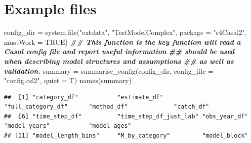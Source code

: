 \documentclass[
]{book}
\newenvironment{Shaded}{\begin{snugshade}}{\end{snugshade}}
\newcommand{\AttributeTok}[1]{\textcolor[rgb]{0.77,0.63,0.00}{#1}}
\newcommand{\ConstantTok}[1]{\textcolor[rgb]{0.00,0.00,0.00}{#1}}
\newcommand{\DocumentationTok}[1]{\textcolor[rgb]{0.56,0.35,0.01}{\textbf{\textit{#1}}}}
\newcommand{\FloatTok}[1]{\textcolor[rgb]{0.00,0.00,0.81}{#1}}
\newcommand{\FunctionTok}[1]{\textcolor[rgb]{0.00,0.00,0.00}{#1}}
\newcommand{\NormalTok}[1]{#1}
\newcommand{\OtherTok}[1]{\textcolor[rgb]{0.56,0.35,0.01}{#1}}
\newcommand{\SpecialCharTok}[1]{\textcolor[rgb]{0.00,0.00,0.00}{#1}}
\newcommand{\StringTok}[1]{\textcolor[rgb]{0.31,0.60,0.02}{#1}}
\begin{document}
\hypertarget{example-files}{%
\section{Example files}\label{example-files}}

\begin{Shaded}
\begin{Highlighting}[]
\NormalTok{config\_dir }\OtherTok{=} \FunctionTok{system.file}\NormalTok{(}\StringTok{"extdata"}\NormalTok{, }\StringTok{"TestModelComplex"}\NormalTok{, }\AttributeTok{package =} \StringTok{"r4Casal2"}\NormalTok{, }\AttributeTok{mustWork =} \ConstantTok{TRUE}\NormalTok{)}
\DocumentationTok{\#\# This function is the key function will read a Casal config file and report useful information}
\DocumentationTok{\#\# should be used when describing model structures and assumptions}
\DocumentationTok{\#\# as well as validation.}
\NormalTok{summary }\OtherTok{=} \FunctionTok{summarise\_config}\NormalTok{(config\_dir, }\AttributeTok{config\_file =} \StringTok{"config.csl2"}\NormalTok{, }\AttributeTok{quiet =}\NormalTok{ T)}
\FunctionTok{names}\NormalTok{(summary)}
\end{Highlighting}
\end{Shaded}

\begin{verbatim}
##  [1] "category_df"           "estimate_df"           "full_category_df"      "method_df"             "catch_df"             
##  [6] "time_step_df"          "time_step_df_just_lab" "obs_year_df"           "model_years"           "model_ages"           
## [11] "model_length_bins"     "M_by_category"         "model_block"
\end{verbatim}

\begin{Shaded}
\end{Shaded}
\end{document}
